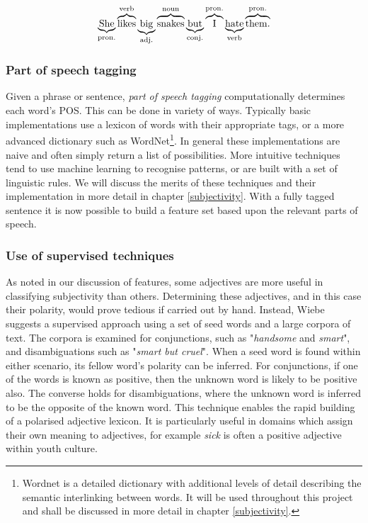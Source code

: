 \begin{equation}
	\underbrace{{\rm She}}_{\rm pron.} \overbrace{{\rm likes}}^{\rm verb} \underbrace{{\rm big}}_{\rm adj.} \overbrace{{\rm snakes}}^{\rm noun} \underbrace{{\rm but}}_{\rm conj.} \overbrace{{\rm I}}^{\rm pron.} \underbrace{{\rm hate}}_{\rm verb} \overbrace{{\rm them.}}^{\rm pron.}
\end{equation}

\subsubsection{Part of speech tagging}
\label{background:pos}

Given a phrase or sentence, \emph{part of speech tagging} computationally determines each word's POS. This can be done in variety of ways. Typically basic implementations use a lexicon of words with their appropriate tags, or a more advanced dictionary such as WordNet\footnote{Wordnet is a detailed dictionary with additional levels of detail describing the semantic interlinking between words. It will be used throughout this project and shall be discussed in more detail in chapter \ref{subjectivity}.}. In general these implementations are naive and often simply return a list of possibilities. More intuitive techniques tend to use machine learning to recognise patterns, or are built with a set of linguistic rules. We will discuss the merits of these techniques and their implementation in more detail in chapter \ref{subjectivity}. With a fully tagged sentence it is now possible to build a feature set based upon the relevant parts of speech.

\subsubsection{Use of supervised techniques}

As noted in our discussion of features, some adjectives are more useful in classifying subjectivity than others. Determining these adjectives, and in this case their polarity, would prove tedious if carried out by hand. Instead, Wiebe \cite{Wiebe:2000ub} suggests a supervised approach using a set of seed words and a large corpora of text. The corpora is examined for conjunctions, such as "\emph{handsome} and \emph{smart}", and disambiguations such as "\emph{smart but cruel}". When a seed word is found within either scenario, its fellow word's polarity can be inferred. For conjunctions, if one of the words is known as positive, then the unknown word is likely to be positive also. The converse holds for disambiguations, where the unknown word is inferred to be the opposite of the known word. This technique enables the rapid building of a polarised adjective lexicon. It is particularly useful in domains which assign their own meaning to adjectives, for example \emph{sick} is often a positive adjective within youth culture.

